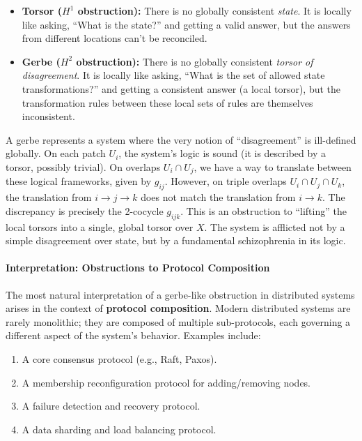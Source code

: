 \documentclass[
]{article}
\providecommand{\tightlist}{%
  \setlength{\itemsep}{0pt}\setlength{\parskip}{0pt}}
\begin{document}
\begin{itemize}
\tightlist
\item
  \textbf{Torsor (\(H^1\) obstruction):} There is no globally consistent
  \emph{state}. It is locally like asking, ``What is the state?'' and
  getting a valid answer, but the answers from different locations can't
  be reconciled.
\item
  \textbf{Gerbe (\(H^2\) obstruction):} There is no globally consistent
  \emph{torsor of disagreement}. It is locally like asking, ``What is
  the set of allowed state transformations?'' and getting a consistent
  answer (a local torsor), but the transformation rules between these
  local sets of rules are themselves inconsistent.
\end{itemize}

A gerbe represents a system where the very notion of ``disagreement'' is
ill-defined globally. On each patch \(U_i\), the system's logic is sound
(it is described by a torsor, possibly trivial). On overlaps
\(U_i \cap U_j\), we have a way to translate between these logical
frameworks, given by \(g_{ij}\). However, on triple overlaps
\(U_i \cap U_j \cap U_k\), the translation from \(i \to j \to k\) does
not match the translation from \(i \to k\). The discrepancy is precisely
the 2-cocycle \(g_{ijk}\). This is an obstruction to ``lifting'' the
local torsors into a single, global torsor over \(X\). The system is
afflicted not by a simple disagreement over state, but by a fundamental
schizophrenia in its logic.

\paragraph{Interpretation: Obstructions to Protocol
Composition}\label{interpretation-obstructions-to-protocol-composition}

The most natural interpretation of a gerbe-like obstruction in
distributed systems arises in the context of \textbf{protocol
composition}. Modern distributed systems are rarely monolithic; they are
composed of multiple sub-protocols, each governing a different aspect of
the system's behavior. Examples include:

\begin{enumerate}
\def\labelenumi{\arabic{enumi}.}
\tightlist
\item
  A core consensus protocol (e.g., Raft, Paxos).
\item
  A membership reconfiguration protocol for adding/removing nodes.
\item
  A failure detection and recovery protocol.
\item
  A data sharding and load balancing protocol.
\end{enumerate}
\end{document}
